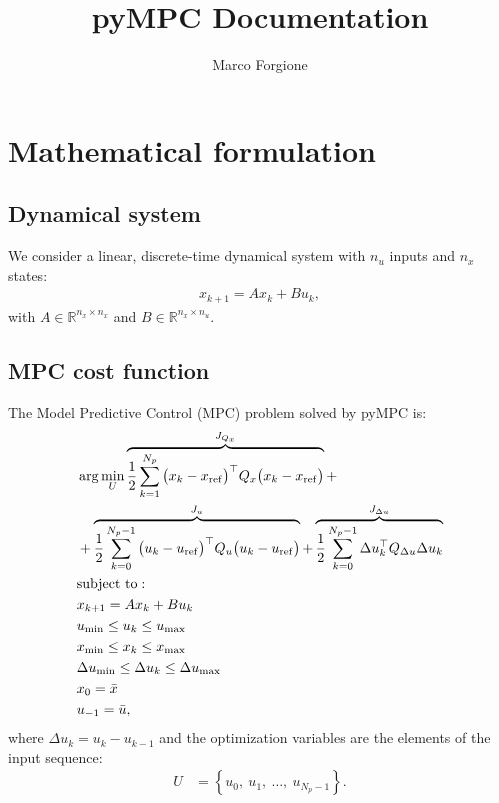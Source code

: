 \documentclass[a4paper,12pt,fleqn]{article}
\newcommand{\nin}{n_u}
\newcommand{\nx}{n_x}
\newcommand{\varu}{{U}}
\newcommand{\Qx}{Q_{x}}
\newcommand{\Qu}{Q_{u}}
\newcommand{\Qdu}{Q_{\Delta u}}
\newcommand{\Np}{{N_p}}
\begin{document}
 \title{pyMPC Documentation}
\author{Marco Forgione}

\maketitle

\section{Mathematical formulation}

\subsection{Dynamical system}
We consider a linear, discrete-time dynamical system with $\nin$ inputs and $\nx$ states:
\begin{align}
 x_{k+1} = A x_{k} + B u_{k},
\end{align}
with $A \in \mathbb{R}^{\nx \times \nx}$ and $B \in \mathbb{R}^{\nx \times \nin}$.

\subsection{MPC cost function}
The Model Predictive Control (MPC) problem solved by pyMPC is:
\begin{subequations}
\label{eq:MPC}
\begin{align}
  &\arg \min_{\varu} 
  \overbrace{\frac{1}{2}\sum_{k=1}^{\Np} \big(x_k - x_{\rm ref}\big)^\top \Qx\big(x_k - x_{\rm ref}\big)}^{J_{Q_x}}+ \nonumber \\
  &  + 
    \overbrace{\frac{1}{2}\sum_{k=0}^{\Np-1} \big(u_k - u_{\rm ref}\big)^\top \Qu \big(u_k - u_{\rm ref}\big)}^{J_u}
    +  
  \overbrace{\frac{1}{2}\sum_{k=0}^{\Np-1} \Delta u_k^\top \Qdu \Delta u_k}^{J_{\Delta u}} \\ \nonumber
  &\text{subject to}: \nonumber\\
  &x_{k+1} = Ax_k + B u_k \label{eq:linear_dynamics} \\ 
  &u_{\rm min} \leq u_k \leq u_{\rm max}\\
  &x_{\rm min} \leq x_k \leq x_{\rm max}\\
  &\Delta u_{\rm min} \leq \Delta u_k \leq \Delta u_{\rm max}\\
  &x_0 = \bar x\\
  &u_{-1} = \bar u,
\end{align}
\end{subequations} where $\Delta u_k = u_k - u_{k-1}$ and the optimization variables are the elements of the input sequence:
\begin{align}
  \varu & = \left\{ u_0,\ u_1,\ \dots, \ u_{\Np-1} \right \}.
\end{align}
\end{document}
